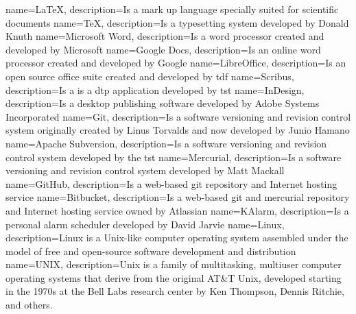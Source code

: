 {
    name=\LaTeX,
    description={Is a mark up language specially suited for scientific documents}
}
{
    name=\TeX,
    description={Is a typesetting system developed by Donald Knuth}
}
{
    name={Microsoft Word},
    description={Is a word processor created and developed by Microsoft}
}
{
    name={Google Docs},
    description={Is an online word processor created and developed by Google}
}
{
    name=LibreOffice,
    description={Is an open source office suite created and developed by \acrlong{tdf}}
}
{
    name=Scribus,
    description={Is a is a \acrlong{dtp} application developed by \acrlong{tst}}
}
{
    name=InDesign,
    description={Is a desktop publishing software developed by Adobe Systems Incorporated}
}
{
    name=Git,
    description={Is a software versioning and revision control system originally created by Linus Torvalds and now developed by Junio Hamano}
}
{
    name={Apache Subversion},
    description={Is a software versioning and revision control system developed by the \acrlong{tst}}
}
{
    name=Mercurial,
    description={Is a software versioning and revision control system developed by Matt Mackall}
}
{
    name=GitHub,
    description={Is a web-based \gls{git} repository and Internet hosting service}
}
{
    name=Bitbucket,
    description={Is a web-based \gls{git} and \gls{mercurial} repository and Internet hosting service owned by Atlassian}
}
{
    name=KAlarm,
    description={Is a personal alarm scheduler developed by David Jarvie}
}
{
    name=Linux,
    description={Linux is a Unix-like computer operating system assembled under the model of free and open-source software development and distribution}
}
{
    name=UNIX,
    description={Unix is a family of multitasking, multiuser computer operating systems that derive from the original AT\&T Unix, developed starting in the 1970s at the Bell Labs research center by Ken Thompson, Dennis Ritchie, and others.}
}



